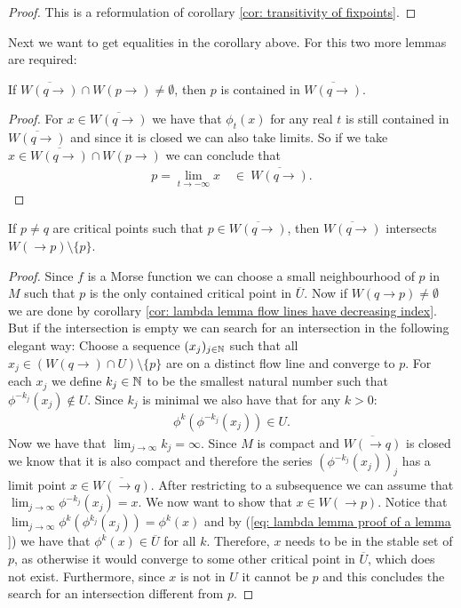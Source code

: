 \begin{proof}
This is a reformulation of corollary \ref{cor: transitivity of fixpoints}.
\end{proof}
Next we want to get equalities in the corollary above. For this two more lemmas are required:
\begin{lemma} \label{lemm: lambda lemma p is in W(q to )}
If $\overline{W(q\to)}\cap W(p\to)\neq \emptyset$, then $p$ is contained in $\overline{W(q \to )}$.
\end{lemma}
\begin{proof}
For $x\in \overline{W(q \to)}$ we have that $\phi_t(x)$ for any real $t$ is still contained in $\overline{W(q \to)}$ and since it is closed we can also take limits. So if we take $x\in \overline{W(q\to)}\cap W(p \to)$ we can conclude that \begin{align*}
p=\lim_{t\to - \infty} x \quad \in ~\overline{W(q \to)}.
\end{align*}
\end{proof}
\begin{lemma}\label{lemm: lambda lemma p is in W(q to )2}
If $p\neq q$ are critical points such that $p\in \overline{W(q \to)}$, then $\overline{W(q\to)}$ intersects $W(\to p)\setminus \{p\}$.
\end{lemma}
\begin{proof}
Since $f$ is a Morse function we can choose a small neighbourhood of $p$ in $M$ such that $p$ is the only contained critical point in $\overline{U}$. Now if $W(q \to p) \neq \emptyset$ we are done by corollary \ref{cor: lambda lemma flow lines have decreasing index}. But if the intersection is empty we can search for an intersection in the following elegant way: 
Choose a sequence $(x_j)_{j\in \mathbb{N}}$ such that all $x_j\in (W(q\to )\cap U) \setminus \{p\}$ are on a distinct flow line and converge to $p$. For each $x_j$ we define $k_j\in  \mathbb{N}$ to be the smallest natural number such that $\phi^{-k_j}(x_j)\notin U$. Since $k_j$ is minimal we also have that for any $k>0$:
\begin{align} \label{eq: lambda lemma proof of a lemma }
\phi^k(\phi^{-k_j}(x_j))\in U. 
\end{align}
 Now we have that $\lim_{j\to \infty}k_j=\infty$. Since $M$ is compact and $\overline{W(\to q)}$ is closed we know that it is also compact and therefore the series $(\phi^{-k_j}(x_j))_j$ has a limit point $x\in \overline{W(\to q)}$. After restricting to a subsequence we can assume that $\lim_{j\to \infty} \phi^{-k_j}(x_j)=x$. We now want to show that $x\in W(\to p)$. Notice that $\lim_{j \to \infty}\phi^k(\phi^{k_j}(x_j))=\phi^k(x)$ and by (\ref{eq: lambda lemma proof of a lemma }) we have that $\phi^k(x)\in \overline{U}$ for all $k$. Therefore, $x$ needs to be in the stable set of $p$, as otherwise it would converge to some other critical point in $\overline{U}$, which does not exist. Furthermore, since $x$ is not in $U$ it cannot be $p$ and this concludes the search for an intersection different from $p$.  
\end{proof}
